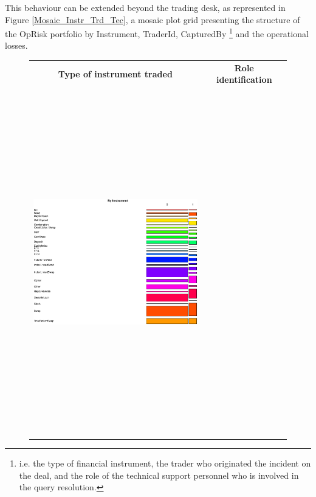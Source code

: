 \documentclass{DissertateUSU}
\begin{document}
This behaviour can be extended beyond the trading desk, as represented
in Figure \ref{Mosaic_Instr_Trd_Tec}, a mosaic plot grid presenting the
structure of the OpRisk portfolio by Instrument, TraderId, CapturedBy
\footnote{i.e. the type of financial instrument, the trader who originated the incident on the deal, and the role of the technical support personnel who is involved in the query resolution.}
and the operational losses.

\singlespacing

\doublespacing

\begin{figure}
\begin{frame}
      \centering
       \begin{tabular}{cc}
        \textbf{Type of instrument traded} & \textbf{Role identification} \\
        \includegraphics[width=7.5cm,height=15cm]{Single_Instr.eps}
         &

\end{tabular}
\end{frame}
\end{figure}
\end{document}
